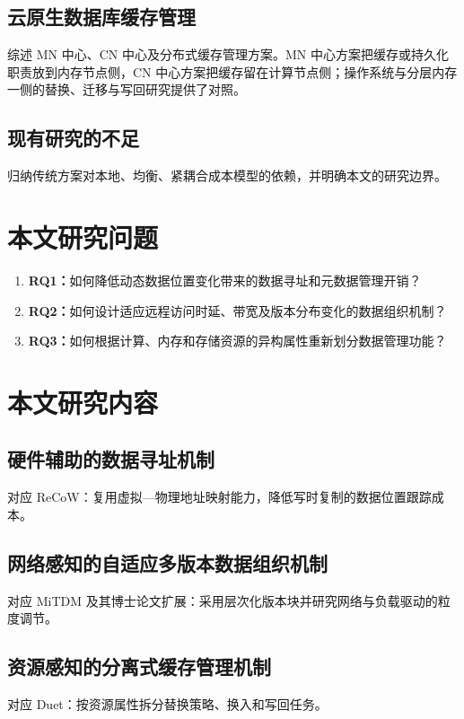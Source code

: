 \subsection{云原生数据库缓存管理}
综述 MN 中心、CN 中心及分布式缓存管理方案。MN 中心方案把缓存或持久化职责放到内存节点侧\cite{caoPolardb2021,zhangTowards2021,ruanPersistent2023}，CN 中心方案把缓存留在计算节点侧\cite{verbitskiAmazon2017,antonopoulosSocrates2019,yangPolardb2024,liGaussdb2024}；操作系统与分层内存一侧的替换、迁移与写回研究提供了对照\cite{stonebrakerOperating1981,leisLeanstore2018,weinerTmo2022,xiangNomad2024,zhongManaging2024,liPond2023}。
\subsection{现有研究的不足}
归纳传统方案对本地、均衡、紧耦合成本模型的依赖，并明确本文的研究边界。

\section{本文研究问题}
\begin{enumerate}
  \item \textbf{RQ1：}如何降低动态数据位置变化带来的数据寻址和元数据管理开销？
  \item \textbf{RQ2：}如何设计适应远程访问时延、带宽及版本分布变化的数据组织机制？
  \item \textbf{RQ3：}如何根据计算、内存和存储资源的异构属性重新划分数据管理功能？
\end{enumerate}

\section{本文研究内容}
\subsection{硬件辅助的数据寻址机制}
对应 ReCoW：复用虚拟—物理地址映射能力，降低写时复制的数据位置跟踪成本。
\subsection{网络感知的自适应多版本数据组织机制}
对应 MiTDM 及其博士论文扩展：采用层次化版本块并研究网络与负载驱动的粒度调节。
\subsection{资源感知的分离式缓存管理机制}
对应 Duet：按资源属性拆分替换策略、换入和写回任务。

